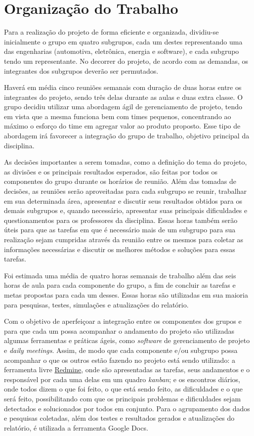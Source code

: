 \chapter[Organização do Trabalho]{Organização do Trabalho}

Para a realização do projeto de forma eficiente e organizada, dividiu-se inicialmente o grupo em quatro subgrupos, cada um destes representando uma das 
engenharias (automotiva, eletrônica, energia e software), e cada subgrupo tendo um representante. No decorrer do projeto, de acordo com as demandas, os 
integrantes dos subgrupos deverão ser permutados. 

Haverá em média cinco reuniões semanais com duração de duas horas entre os integrantes do projeto, sendo três delas durante as aulas e duas extra classe.
O grupo decidiu utilizar uma abordagem ágil de gerenciamento de projeto, tendo em vista que a mesma funciona bem com times pequenos, concentrando ao máximo
o esforço do time em agregar valor ao produto proposto. Esse tipo de abordagem irá favorecer a integração do grupo de trabalho, objetivo principal da disciplina.

As decisões importantes a serem tomadas, como a definição do tema do projeto, as divisões e os principais resultados esperados, são feitas por 
todos os componentes do grupo durante os horários de reunião. Além das tomadas de decisões, as reuniões serão aproveitadas para cada subgrupo se reunir, 
trabalhar em sua determinada área, apresentar e discutir seus resultados obtidos para os demais subgrupos e, quando necessário, apresentar suas principais 
dificuldades e questionamentos para os professores da disciplina. Essas horas também serão úteis para que as tarefas em que é necessário mais de um subgrupo 
para sua realização sejam cumpridas através da reunião entre os mesmos para coletar as informações necessárias e discutir os melhores métodos e soluções para 
essas tarefas.

Foi estimada uma média de quatro horas semanais de trabalho além das seis horas de aula para cada componente do grupo, a fim de concluir as tarefas e metas 
propostas para cada um desses. Essas horas são utilizadas em sua maioria para pesquisas, testes, simulações e atualizações do relatório. 

Com o objetivo de aperfeiçoar a integração entre os componentes dos grupos e para que cada um possa acompanhar o andamento do projeto são utilizadas algumas 
ferramentas e práticas ágeis, como \textit{software} de gerenciamento de projeto e \textit{daily meetings}. Assim, de modo que cada componente e/ou subgrupo 
possa acompanhar o que os outros estão fazendo no projeto está sendo utilizado: a ferramenta livre \href{http://lappis.unb.br/redm}{Redmine}, onde são apresentadas as tarefas, seus andamentos e o 
responsável por cada uma delas em um quadro \textit{kanban}; e os encontros diários, onde todos dizem o que foi feito, o que está sendo feito, as dificuldades
e o que será feito, possibilitando com que os principais problemas e dificuldades sejam detectados e solucionados por todos em conjunto. Para o agrupamento 
dos dados e pesquisas coletadas, além dos testes e resultados gerados e atualizações do relatório, é utilizada a ferramenta Google Docs.

